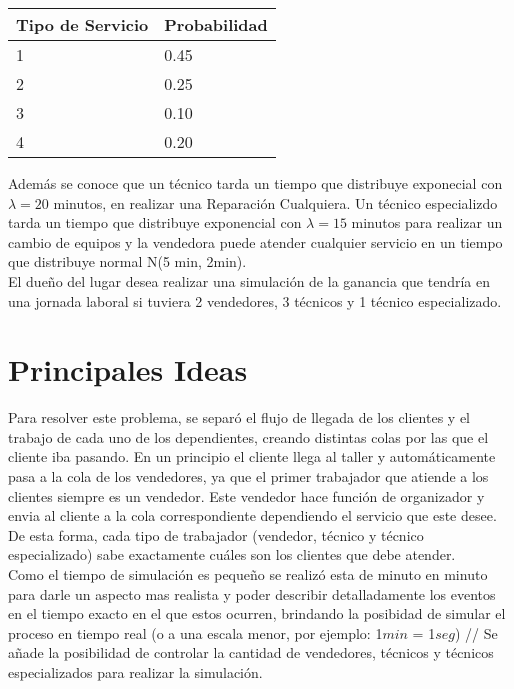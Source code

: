 \documentclass[a4paper,10pt,twocolumn]{article}
\begin{document}
\begin{table} [htbp]
	\begin{center}
		\begin{tabular}{|l|l|}
			\hline
			Tipo de Servicio & Probabilidad \\
			\hline \hline
			1 & 0.45 \\ \hline
			2 & 0.25 \\ \hline
			3 & 0.10 \\ \hline
			4 & 0.20 \\ \hline
			
		\end{tabular}
	\end{center}
\end{table}

Además se conoce que un técnico tarda un tiempo que distribuye exponecial con $\lambda = 20$ minutos, en realizar una Reparación Cualquiera. Un técnico especializdo tarda un tiempo que distribuye exponencial con $\lambda = 15$ minutos para
realizar un cambio de equipos y la vendedora puede atender cualquier servicio en un tiempo que distribuye normal N(5 min, 2min). \\
El dueño del lugar desea realizar una simulación de la ganancia que tendría en una jornada laboral si tuviera 2 vendedores, 3 técnicos y 1 técnico especializado.



\section{Principales Ideas}\label{sec:dev}

Para resolver este problema, se separó el flujo de llegada de los clientes y el trabajo de cada uno de los dependientes, creando distintas colas por las que el cliente iba pasando. En un principio el cliente llega al taller y automáticamente pasa a la cola de los vendedores, ya que el primer trabajador que atiende a los clientes siempre es un vendedor. Este vendedor hace función de organizador y envia al cliente a la cola correspondiente dependiendo el servicio que este desee. De esta forma, cada tipo de trabajador (vendedor, técnico y técnico especializado) sabe exactamente cuáles son los clientes que debe atender. \\
Como el tiempo de simulación es pequeño se realizó esta de minuto en minuto para darle un aspecto mas realista y poder describir detalladamente los eventos en el tiempo exacto en el que estos ocurren, brindando la posibidad de simular el proceso en tiempo real (o a una escala menor, por ejemplo: 1$min$ = 1$seg$) //
Se añade la posibilidad de controlar la cantidad de vendedores, técnicos y técnicos especializados para realizar la simulación.
\end{document}
